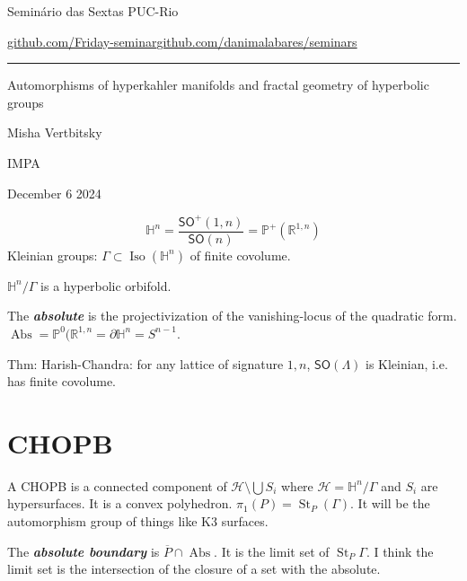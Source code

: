 


\begin{minipage}{\textwidth}
	\begin{minipage}{1\textwidth}
		Semin\'ario das Sextas \hfill PUC-Rio
		
		{\small\href{https://github.com/Friday-seminar/}{github.com/Friday-seminar}\hfill\href{https://github.com/danimalabares/seminars}{github.com/danimalabares/seminars}}
		\end{minipage}
\end{minipage}\vspace{.2cm}\hrule

\vspace{10pt}

{\Huge Automorphisms of hyperkahler manifolds and fractal geometry of hyperbolic groups}


\hfill{\Large Misha Vertbitsky}

\hfill{\Large IMPA}

\hfill{\large December 6 2024}

\[\mathbb{H}^n=\frac{\mathsf{SO}^+(1,n)}{\mathsf{SO}(n)}=\mathbb{P}^+(\mathbb{R}^{1,n})\]
Kleinian groups: $\Gamma \subset \operatorname{Is o}(\mathbb{H}^n)$ of finite covolume.

$\mathbb{H}^n/\Gamma$ is a hyperbolic orbifold.

The \textit{\textbf{absolute}} is the projectivization of the vanishing-locus of the quadratic form. $\operatorname{A bs }=\mathbb{P}^0(\mathbb{R}^{1,n}=\partial\mathbb{H}^n=S^{n-1}$.


Thm: Harish-Chandra: for any lattice of signature $1,n$,  $\mathsf{SO}(\Lambda)$ is Kleinian, i.e. has finite covolume.

\section{CHOPB}

A CHOPB is a connected component of $\mathcal{H}\setminus \bigcup S_i $ where $\mathcal{H}=\mathbb{H}^n/\Gamma$ and $S_i$ are hypersurfaces. It is a convex polyhedron. $\pi_1(P)=\operatorname{St}_P(\Gamma)$. It will be the automorphism group of things like K3 surfaces.

The \textit{\textbf{absolute boundary}} is $\overline{P}\cap \operatorname{Ab s}$. It is the limit set of $\operatorname{S t}_P\Gamma$. I think the limit set is the intersection of the closure of a set with the absolute.

